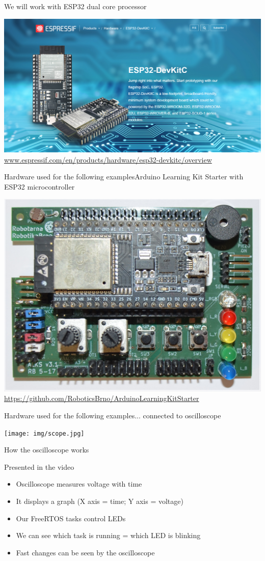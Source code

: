 \documentclass[
aspectratio=169,
]{beamer}
\begin{document}
\begin{frame}{We will work with ESP32 dual core processor}
	\begin{center}
		\includegraphics[width=.8\textwidth]{img/esp32-devkitc.png}\\
		\url{www.espressif.com/en/products/hardware/esp32-devkitc/overview}
	\end{center}
\end{frame}

\begin{frame}{Hardware used for the following examples}{Arduino Learning Kit Starter with ESP32 microcontroller}
	\begin{center}
		\includegraphics[width=.5\textwidth]{img/alks.jpg}\\
		\url{https://github.com/RoboticsBrno/ArduinoLearningKitStarter}
	\end{center}
\end{frame}

\begin{frame}{Hardware used for the following examples}{... connected to oscilloscope}
	\begin{center}
		\texttt{[image: img/scope.jpg]}
	\end{center}
\end{frame}

\begin{frame}{How the oscilloscope works}
	\begin{block}{Presented in the video}
		\begin{itemize}
			\item Oscilloscope measures voltage with time
			\item It displays a graph (X axis = time; Y axis = voltage)
			\item Our FreeRTOS tasks control LEDs
			\item We can see which task is running = which LED is blinking
			\item Fast changes can be seen by the oscilloscope
		\end{itemize}
	\end{block}
\end{frame}
\end{document}
